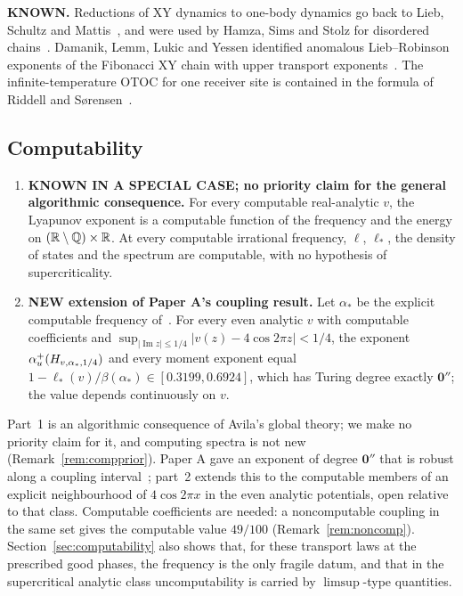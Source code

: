 \begin{remark}\label{rem:D}
\textbf{KNOWN.} Reductions of XY dynamics to one-body dynamics go back to Lieb, Schultz and Mattis~\cite{LSM1961}, and were used by Hamza, Sims and Stolz for disordered chains~\cite{HSS2012}. Damanik, Lemm, Lukic and Yessen identified anomalous Lieb--Robinson exponents of the Fibonacci XY chain with upper transport exponents~\cite{DLLY2016}. The infinite-temperature OTOC for one receiver site is contained in the formula of Riddell and S{\o}rensen~\cite{RiddellSorensen2020}.
\end{remark}

\subsection{Computability}

\begin{maintheorem}[Computability]\label{thm:E}
\begin{enumerate}
\item \textbf{KNOWN IN A SPECIAL CASE; no priority claim for the general algorithmic consequence.} For every computable real-analytic $v$, the Lyapunov exponent is a computable function of the frequency and the energy on $(\mathbb R\setminus\mathbb Q)\times\mathbb R$. At every computable irrational frequency, $\ell$, $\ell_*$, the density of states and the spectrum are computable, with no hypothesis of supercriticality.
\item \textbf{NEW extension of Paper A's coupling result.} Let $\alpha_*$ be the explicit computable frequency of~\cite[Theorem~D(3)]{DMamo}. For every even analytic $v$ with computable coefficients and $\sup_{|\operatorname{Im}z|\le1/4}|v(z)-4\cos2\pi z|<1/4$, the exponent $\alpha_u^+(H_{v,\alpha_*,1/4})$ and every moment exponent equal $1-\ell_*(v)/\beta(\alpha_*)\in[0.3199,0.6924]$, which has Turing degree exactly $\mathbf 0''$; the value depends continuously on $v$.
\end{enumerate}
\end{maintheorem}

Part~1 is an algorithmic consequence of Avila's global theory; we make no priority claim for it, and computing spectra is not new (Remark~\ref{rem:compprior}). Paper A gave an exponent of degree $\mathbf 0''$ that is robust along a coupling interval~\cite[Theorem~D]{DMamo}; part~2 extends this to the computable members of an explicit neighbourhood of $4\cos2\pi x$ in the even analytic potentials, open relative to that class. Computable coefficients are needed: a noncomputable coupling in the same set gives the computable value $49/100$ (Remark~\ref{rem:noncomp}). Section~\ref{sec:computability} also shows that, for these transport laws at the prescribed good phases, the frequency is the only fragile datum, and that in the supercritical analytic class uncomputability is carried by $\limsup$-type quantities.

